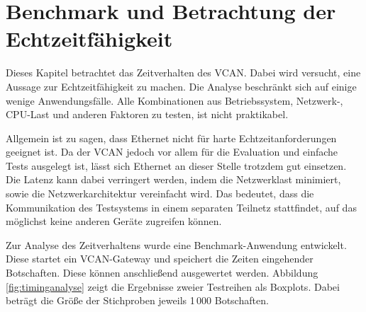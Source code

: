 \documentclass[
  a4paper,					    %
  twoside,
  DIV=calc,     				%
  bibliography=totoc,
  cleardoublepage=empty,
  ngerman,     					%
  final       					%
]{scrbook}
\begin{document}
% 
\section{Benchmark und Betrachtung der Echtzeitfähigkeit}
\label{sec:Benchmark}
Dieses Kapitel betrachtet das Zeitverhalten des VCAN. Dabei wird versucht, eine Aussage zur Echtzeitfähigkeit zu machen. Die Analyse beschränkt sich auf einige wenige Anwendungsfälle. Alle Kombinationen aus Betriebssystem, Netzwerk-, CPU-Last und anderen Faktoren zu testen, ist nicht praktikabel.

Allgemein ist zu sagen, dass Ethernet nicht für harte Echtzeitanforderungen geeignet ist. Da der VCAN jedoch vor allem für die Evaluation und einfache Tests ausgelegt ist, lässt sich Ethernet an dieser Stelle trotzdem gut einsetzen. Die Latenz kann dabei verringert werden, indem die Netzwerklast minimiert, sowie die Netzwerkarchitektur vereinfacht wird. Das bedeutet, dass die Kommunikation des Testsystems in einem separaten Teilnetz stattfindet, auf das möglichst keine anderen Geräte zugreifen können. 

Zur Analyse des Zeitverhaltens wurde eine Benchmark-Anwendung entwickelt. Diese startet ein VCAN-Gateway und speichert die Zeiten eingehender Botschaften. Diese können anschließend ausgewertet werden. Abbildung \ref{fig:timinganalyse} zeigt die Ergebnisse zweier Testreihen als Boxplots. Dabei beträgt die Größe der Stichproben jeweils 1\,000 Botschaften.

\end{document}

